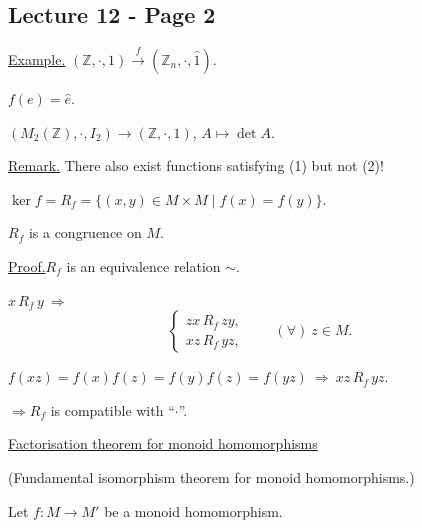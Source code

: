 
\subsection*{Lecture 12 - Page 2}

\noindent\underline{Example.}\quad
$(\mathbb{Z},\cdot,1)\xrightarrow{\ f\ }(\mathbb{Z}_n,\cdot,\hat 1)$.

\noindent $f(e)=\hat e$.

\bigskip
\noindent
$(M_2(\mathbb{Z}),\cdot,I_2)\longrightarrow(\mathbb{Z},\cdot,1)$,
\qquad $A\longmapsto\det A$.

\bigskip
\noindent\underline{Remark.}\quad
There also exist functions satisfying (1) but not (2)!

\bigskip
\noindent $\ker f=R_f=\{(x,y)\in M\times M\mid f(x)=f(y)\}$.

\noindent $R_f$ is a congruence on $M$.

\bigskip
\noindent\underline{Proof.}\quad $R_f$ is an equivalence relation $\sim$.

\medskip
\noindent $x\,R_f\,y\ \Longrightarrow$
\[
\begin{cases}
 zx\,R_f\,zy,\\
 xz\,R_f\,yz,
\end{cases}
\qquad (\forall)\ z\in M.
\]

\noindent
$f(xz)=f(x)f(z)=f(y)f(z)=f(yz)\ \Longrightarrow\ xz\,R_f\,yz$.

\medskip
\noindent $\Longrightarrow R_f$ is compatible with ``$\cdot$''.

\bigskip
\noindent{}\quad
\underline{Factorisation theorem for monoid homomorphisms}

\noindent (Fundamental isomorphism theorem for monoid homomorphisms.)

\bigskip
\noindent Let $f:M\longrightarrow M'$ be a monoid homomorphism.

